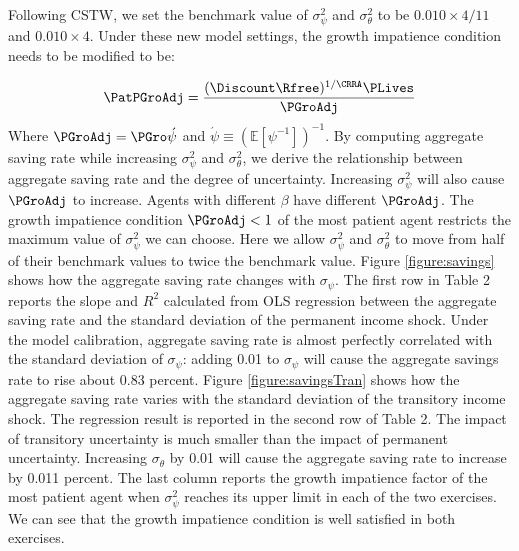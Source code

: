 
Following CSTW, we set the benchmark value of $\sigma_{\psi}^{2}$ and $\sigma_{\theta}^{2}$ to be $0.010\times4/11$ and $0.010\times4$. Under these new model settings, the growth impatience condition needs to be modified to be:

\begin{align}
	\PatPGroAdj = \frac{(\Discount \Rfree)^{1/\CRRA}\PLives}{\PGroAdj}
\end{align}
Where $\PGroAdj=\PGro \acute{\psi}$ and $\acute{\psi}\equiv (\mathbb{E}[\psi^{-1}])^{-1}$. By computing aggregate saving rate while increasing $\sigma_{\psi}^{2}$ and $\sigma_{\theta}^{2}$,  we derive the relationship between aggregate saving rate and the degree of uncertainty. Increasing $\sigma_{\psi}^{2}$ will also cause $\PGroAdj$ to increase. Agents with different $\beta$ have different $\PGroAdj$. The growth impatience condition $\PGroAdj<1$ of the most patient agent restricts the maximum value of $\sigma_{\psi}^{2}$ we can choose. Here we allow $\sigma_{\psi}^{2}$ and $\sigma_{\theta}^{2}$ to move from half of their benchmark values to twice the benchmark value.  Figure \ref{figure:savings} shows how the aggregate saving rate changes with $\sigma_{\psi}$. The first row in Table 2 reports the slope and $R^2$ calculated from OLS regression between the aggregate saving rate and the standard deviation of the permanent income shock. Under the model calibration, aggregate saving rate is almost perfectly correlated with the standard deviation of $\sigma_{\psi}$: adding 0.01 to $\sigma_{\psi}$ will cause the aggregate savings rate to rise about 0.83 percent. Figure \ref{figure:savingsTran} shows how the aggregate saving rate varies with the standard deviation of the transitory income shock. The regression result is reported in the second row of Table 2. The impact of transitory uncertainty is much smaller than the impact of permanent uncertainty. Increasing  $\sigma_{\theta}$ by 0.01 will cause the aggregate saving rate to increase by 0.011 percent. The last column reports the growth impatience factor of the most patient agent when $\sigma_{\psi}^{2}$ reaches its upper limit in each of the two exercises. We can see that the growth impatience condition is well satisfied in both exercises.
